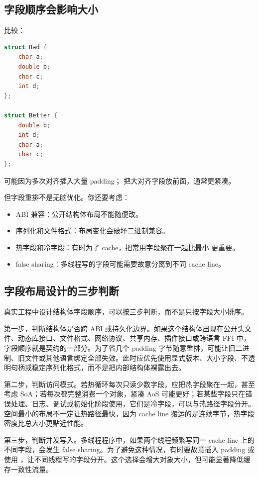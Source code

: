 \subsection{字段顺序会影响大小}

比较：

\begin{lstlisting}[language=C++]
struct Bad {
    char a;
    double b;
    char c;
    int d;
};

struct Better {
    double b;
    int d;
    char a;
    char c;
};
\end{lstlisting}

 可能因为多次对齐插入大量 padding； 把大对齐字段放前面，通常更紧凑。

但字段重排不是无脑优化。你还要考虑：

\begin{itemize}
  \item ABI 兼容：公开结构体布局不能随便改。
  \item 序列化和文件格式：布局变化会破坏二进制兼容。
  \item 热字段和冷字段：有时为了 cache，把常用字段聚在一起比最小  更重要。
  \item false sharing：多线程写的字段可能需要故意分离到不同 cache line。
\end{itemize}

\subsection{字段布局设计的三步判断}

真实工程中设计结构体字段顺序，可以按三步判断，而不是只按字段大小排序。

第一步，判断结构体是否跨 ABI 或持久化边界。如果这个结构体出现在公开头文件、动态库接口、文件格式、网络协议、共享内存、插件接口或跨语言 FFI 中，字段顺序就是契约的一部分。为了省几个 padding 字节随意重排，可能让旧二进制、旧文件或其他语言绑定全部失效。此时应优先使用显式版本、大小字段、不透明句柄或稳定序列化格式，而不是把内部结构体裸露出去。

第二步，判断访问模式。若热循环每次只读少数字段，应把热字段聚在一起，甚至考虑 SoA；若每次都完整消费一个对象，紧凑 AoS 可能更好；若某些字段只在错误处理、日志、调试或初始化阶段使用，它们是冷字段，可以与热路径字段分开。空间最小的布局不一定让热路径最快，因为 cache line 搬运的是连续字节，热字段密度比总大小更贴近性能。

第三步，判断并发写入。多线程程序中，如果两个线程频繁写同一 cache line 上的不同字段，会发生 false sharing。为了避免这种情况，有时要故意插入 padding 或使用 ，让不同线程写的字段分开。这个选择会增大对象大小，但可能显著降低缓存一致性流量。

